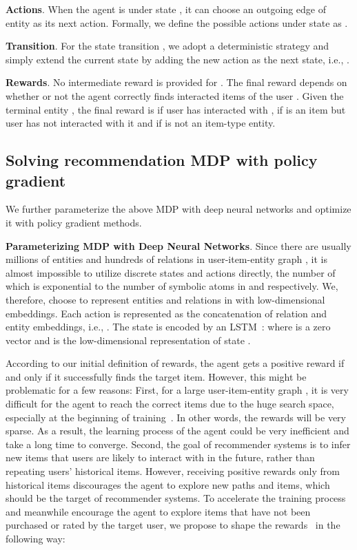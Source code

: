 \documentclass{article}
\newcommand{\xhdr}[1]{{\noindent\bfseries #1}.}
\begin{document}
\xhdr{Actions} When the agent is under state , it can choose an outgoing edge of entity  as its next action.
Formally, we define the possible actions under state  as .

\xhdr{Transition} For the state transition , we adopt a deterministic strategy and simply extend the current state  by adding the new action  as the next state, i.e., .


\xhdr{Rewards} No intermediate reward is provided for . The final reward depends on whether or not the agent correctly finds interacted items of the user .
Given the terminal entity , the final reward  is  if user  has interacted with ,  if  is an item but user  has not interacted with it and  if  is not an item-type entity.


\subsection{Solving recommendation MDP with policy gradient}

We further parameterize the above MDP with deep neural networks and optimize it with policy gradient methods.

\xhdr{Parameterizing MDP with Deep Neural Networks} Since there are usually millions of entities and hundreds of relations in user-item-entity graph , it is almost impossible to utilize discrete states and actions directly, the number of which is exponential to the number of symbolic atoms in  and  respectively. We, therefore, choose to represent entities and relations in  with low-dimensional embeddings. Each action  is represented as the concatenation of relation and entity embeddings, i.e., . The state  is encoded by an LSTM~\cite{hochreiter1997long}:
where  is a zero vector and  is the low-dimensional representation of state . 


According to our initial definition of rewards, the agent gets a positive reward if and only if it successfully finds the target item. However, this might be problematic for a few reasons: First, for a large user-item-entity graph , it is very difficult for the agent to reach the correct items due to the huge search space, especially at the beginning of training~\cite{xiong2017deeppath}. In other words, the rewards will be very sparse. As a result, the learning process of the agent could be very inefficient and take a long time to converge. Second, the goal of recommender systems is to infer new items that users are likely to interact with in the future, rather than repeating users' historical items. However, receiving positive rewards only from historical items discourages the agent to explore new paths and items, which should be the target of recommender systems. To accelerate the training process and meanwhile encourage the agent to explore items that have not been purchased or rated by the target user, 
we propose to shape the rewards~\cite{ng1999policy} in the following way: 
\end{document}
